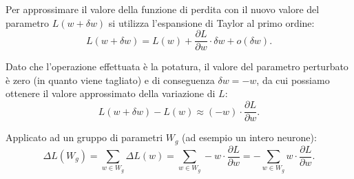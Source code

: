 Per approssimare il valore della funzione di perdita con il nuovo valore del
parametro $L(w + \delta w)$ si utilizza l'espansione di Taylor al primo ordine:
\begin{equation}
    L(w + \delta w) = L(w) + \frac{\partial L}{\partial w} \cdot \delta w + {o}(\delta{w}).
\end{equation}

Dato che l'operazione effettuata è la potatura, il valore del parametro
perturbato è zero (in quanto viene tagliato) e di conseguenza $\delta w = -w$,
da cui possiamo ottenere il valore approssimato della variazione di $L$:
\begin{equation}
    L(w + \delta w) - L(w) \approx (-w) \cdot \frac{\partial L}{\partial w}.
\end{equation}

Applicato ad un gruppo di parametri $W_g$ (ad esempio un intero neurone):
\begin{equation}
    \Delta L(W_g) = \sum_{w \in W_g} \Delta L(w) = \sum_{w \in W_g} -w \cdot \frac{\partial L}{\partial w} = - \sum_{w \in W_g} w \cdot \frac{\partial L}{\partial w}.
\end{equation}

